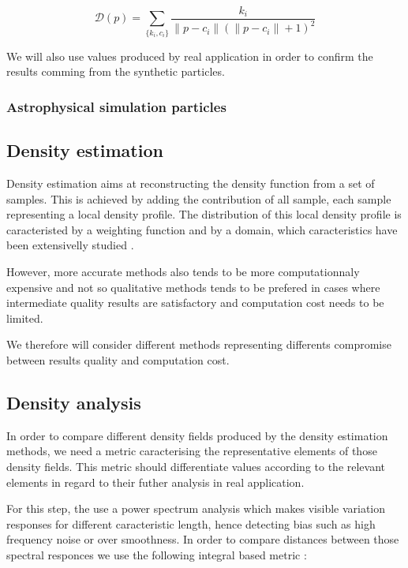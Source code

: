 \documentclass[10pt,a4paper,twoside,twocolumn]{article}
\begin{document}
\begin{equation}
	\mathcal D(p) = \sum_{\{k_i, c_i\}} \frac{k_i}{\|p-c_i\|(\|p-c_i\|+1)^2}
\end{equation}

We will also use values produced by real application in order to confirm the
results comming from the synthetic particles.

\subsubsection{Astrophysical simulation particles}


\subsection{Density estimation}

Density estimation aims at reconstructing the density function from a set of
samples. This is achieved by adding the contribution of all sample, each sample
representing a local density profile. The distribution of this local density
profile is caracteristed by a weighting function and by a domain, which
caracteristics have been extensivelly studied
.

However, more accurate methods also tends to be more computationnaly expensive
and not so qualitative methods tends to be prefered in cases where intermediate
quality results are satisfactory and computation cost needs to be limited.

We therefore will consider different methods representing differents compromise
between results quality and computation cost.

\subsection{Density analysis}

In order to compare different density fields produced by the density estimation
methods, we need a metric caracterising the representative elements of those
density fields. This metric should differentiate values according to the
relevant elements in regard to their futher analysis in real application.

For this step, the use a power spectrum analysis which makes visible variation
responses for different caracteristic length, hence detecting bias such as high
frequency noise or over smoothness. In order to compare distances between those
spectral responces we use the following integral based metric :
\end{document}
